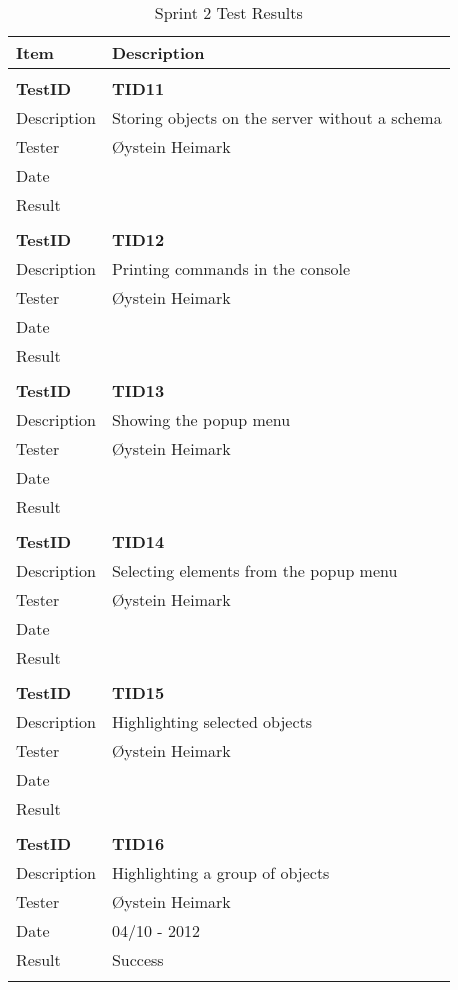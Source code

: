 \begin{table}
\caption{Sprint 2 Test Results}
\centering
\begin{tabular}{ l p{13cm} }

\hline 
Item			&Description		\\
\hline \\ [-2.0ex]

\bf{TestID}		&\bf{TID11}			\\
Description	&Storing objects on the server without a schema	\\
Tester		&Øystein Heimark	\\
Date			&	\\
Result		&				\\
\hline \\ [-2.0ex]

\bf{TestID}		&\bf{TID12}			\\
Description	&Printing commands in the console 	\\
Tester		&Øystein Heimark	\\
Date			&	\\
Result		&			\\
\hline \\ [-2.0ex]

\bf{TestID}		&\bf{TID13}			\\
Description	&Showing the popup menu	\\
Tester		&Øystein Heimark	\\
Date			&	\\
Result		&				\\
\hline \\ [-2.0ex]

\bf{TestID}		&\bf{TID14}			\\
Description	&Selecting elements from the popup menu	\\
Tester		&Øystein Heimark	\\
Date			&	\\
Result		&				\\
\hline \\ [-2.0ex]

\bf{TestID}		&\bf{TID15}			\\
Description	&Highlighting selected objects	\\
Tester		&Øystein Heimark	\\
Date			&	\\
Result		&				\\
\hline \\ [-2.0ex]

\bf{TestID}		&\bf{TID16}			\\
Description	&Highlighting a group of objects\\
Tester		&Øystein Heimark	\\
Date			&04/10 - 2012	\\
Result		&Success			\\
\hline \\ [-2.0ex]


\end{tabular}
\end{table}
